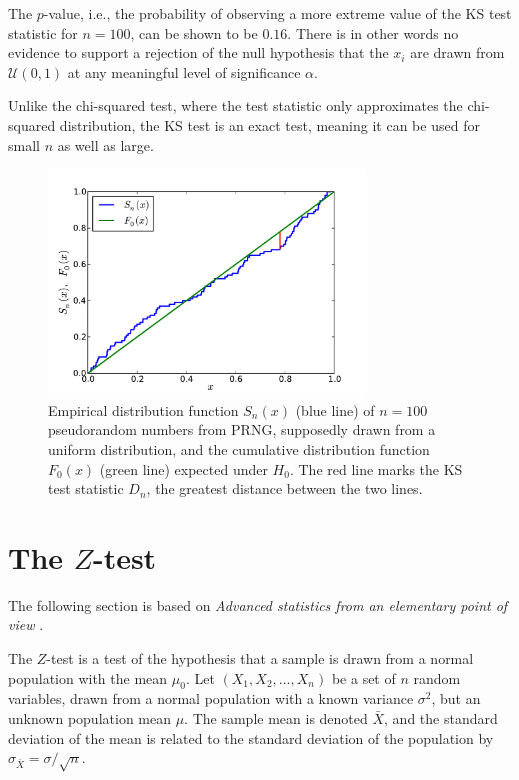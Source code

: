 The $p$-value, i.e., the probability of observing a more extreme value of the KS test statistic for $n=100$, can be shown to be $0.16$. There is in other words no evidence to support a rejection of the null hypothesis that the $x_i$ are drawn from $\mathcal{U}(0, 1)$ at any meaningful level of significance $\alpha$.

Unlike the chi-squared test, where the test statistic only approximates the chi-squared distribution, the KS test is an exact test, meaning it can be used for small $n$ as well as large.

\begin{figure}[h]
  \centering
  \includegraphics[width=0.75\textwidth]{edf.pdf}
  \caption[CDF for $X \sim \mathcal{U}(1, 0)$ and EDF of pseudorandom numbers from a PRNG]{Empirical distribution function $S_n(x)$ (blue line) of $n = 100$ pseudorandom numbers from PRNG, supposedly drawn from a uniform distribution, and the cumulative distribution function $F_0(x)$ (green line) expected under $H_0$. The red line marks the KS test statistic $D_n$, the greatest distance between the two lines.}
  \label{fig:edf_ex}
\end{figure}



\section{The $Z$-test\label{sec:z}}

The following section is based on \emph{Advanced statistics from an elementary point of view} .

The $Z$-test is a test of the hypothesis that a sample is drawn from a normal population with the mean $\mu_0$. Let $(X_1, X_2, ..., X_n)$ be a set of $n$ random variables, drawn from a normal population with a known variance $\sigma^2$, but an unknown population mean $\mu$. The sample mean is denoted $\bar{X}$, and the standard deviation of the mean is related to the standard deviation of the population by $\sigma_{\bar{X}} = \sigma / \sqrt{n}$.

